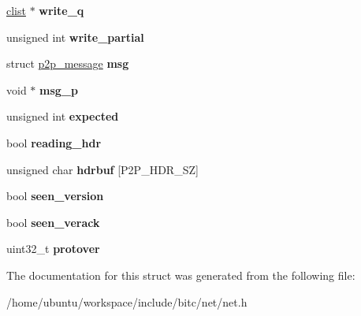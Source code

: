 \begin{DoxyCompactItemize}
\item 
\hypertarget{structnc__conn_af181044b7af6a2f59ff4c00b3300f275}{\hyperlink{structclist}{clist} $\ast$ {\bfseries write\-\_\-q}}\label{structnc__conn_af181044b7af6a2f59ff4c00b3300f275}

\item 
\hypertarget{structnc__conn_a2a3e5a6acbd8acba1af6d5a94a672c23}{unsigned int {\bfseries write\-\_\-partial}}\label{structnc__conn_a2a3e5a6acbd8acba1af6d5a94a672c23}

\item 
\hypertarget{structnc__conn_a8c5a0b6f156e751cb4c7e4501a47b7ba}{struct \hyperlink{structp2p__message}{p2p\-\_\-message} {\bfseries msg}}\label{structnc__conn_a8c5a0b6f156e751cb4c7e4501a47b7ba}

\item 
\hypertarget{structnc__conn_a6b845c88f7d63ca1d11cafed48dddd8a}{void $\ast$ {\bfseries msg\-\_\-p}}\label{structnc__conn_a6b845c88f7d63ca1d11cafed48dddd8a}

\item 
\hypertarget{structnc__conn_a814a7f5e8b493a1c58cb14c824b26404}{unsigned int {\bfseries expected}}\label{structnc__conn_a814a7f5e8b493a1c58cb14c824b26404}

\item 
\hypertarget{structnc__conn_aeabe10f6a4ca7221d3dda8be83335d93}{bool {\bfseries reading\-\_\-hdr}}\label{structnc__conn_aeabe10f6a4ca7221d3dda8be83335d93}

\item 
\hypertarget{structnc__conn_a73e8cc195f6ab0c907be85de7c13329b}{unsigned char {\bfseries hdrbuf} \mbox{[}P2\-P\-\_\-\-H\-D\-R\-\_\-\-S\-Z\mbox{]}}\label{structnc__conn_a73e8cc195f6ab0c907be85de7c13329b}

\item 
\hypertarget{structnc__conn_afce83e58195c68631feb560ad2b7f6ed}{bool {\bfseries seen\-\_\-version}}\label{structnc__conn_afce83e58195c68631feb560ad2b7f6ed}

\item 
\hypertarget{structnc__conn_a994eaa02bf18c48e433c3d4f38074a90}{bool {\bfseries seen\-\_\-verack}}\label{structnc__conn_a994eaa02bf18c48e433c3d4f38074a90}

\item 
\hypertarget{structnc__conn_a32808c425641ef09af9725f8acba11d8}{uint32\-\_\-t {\bfseries protover}}\label{structnc__conn_a32808c425641ef09af9725f8acba11d8}

\end{DoxyCompactItemize}


The documentation for this struct was generated from the following file\-:\begin{DoxyCompactItemize}
\item 
/home/ubuntu/workspace/include/bitc/net/net.\-h\end{DoxyCompactItemize}
